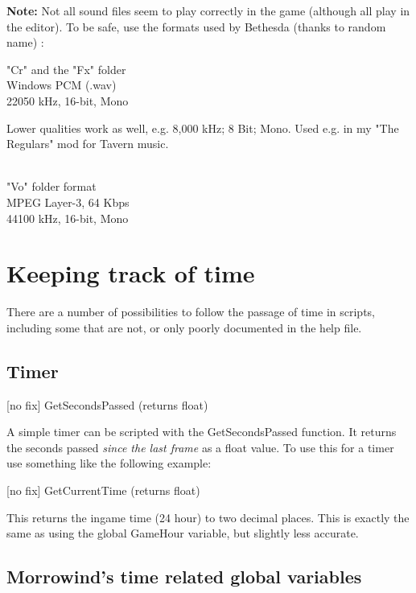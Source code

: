\textbf{Note:} Not all sound files seem to play correctly in the game
(although all play in the editor). To be safe, use the formats used by
Bethesda (thanks to random name) :

"Cr" and the "Fx" folder\\
Windows PCM (.wav)\\
22050 kHz, 16-bit, Mono

Lower qualities work as well, e.g. 8,000 kHz; 8 Bit; Mono. Used e.g. in
my "The Regulars" mod for Tavern music.\\
\strut \\
"Vo" folder format\\
MPEG Layer-3, 64 Kbps\\
44100 kHz, 16-bit, Mono

\hypertarget{keeping-track-of-time}{%
\section{\texorpdfstring{\hfill\break
Keeping track of
time}{ Keeping track of time}}\label{keeping-track-of-time}}

There are a number of possibilities to follow the passage of time in
scripts, including some that are not, or only poorly documented in the
help file.

\hypertarget{timer}{%
\subsection{Timer}\label{timer}}

{[}no fix{]} GetSecondsPassed (returns float)

A simple timer can be scripted with the GetSecondsPassed function. It
returns the seconds passed \emph{since the last frame} as a float value.
To use this for a timer use something like the following example:



{[}no fix{]} GetCurrentTime (returns float)

This returns the ingame time (24 hour) to two decimal places. This is
exactly the same as using the global GameHour variable, but slightly
less accurate.

\hypertarget{morrowinds-time-related-global-variables}{%
\subsection{Morrowind's time related global
variables}\label{morrowinds-time-related-global-variables}}

